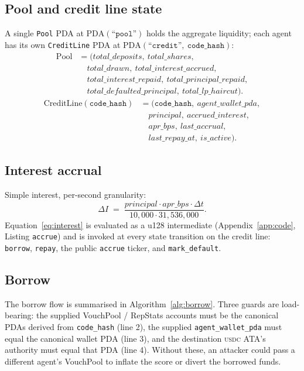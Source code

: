 \documentclass[10pt,conference,letterpaper]{IEEEtran}
\theoremstyle{definition}
\newcommand{\codehash}{\texttt{code\_hash}}
\newcommand{\PDA}[1]{\ensuremath{\mathrm{PDA}(#1)}}
\newcommand{\USDC}{\textsc{usdc}}
\begin{document}
\subsection{Pool and credit line state}

A single \texttt{Pool} PDA at $\PDA{\texttt{``pool''}}$ holds the
aggregate liquidity; each agent has its own
\texttt{CreditLine} PDA at $\PDA{\texttt{``credit''},\ \codehash}$:
\begin{align*}
\mathrm{Pool} &= \bigl(
  \mathit{total\_deposits},\ \mathit{total\_shares},\\
  &\quad \mathit{total\_drawn},\ \mathit{total\_interest\_accrued},\\
  &\quad \mathit{total\_interest\_repaid},\ \mathit{total\_principal\_repaid},\\
  &\quad \mathit{total\_defaulted\_principal},\ \mathit{total\_lp\_haircut}\bigr).
\end{align*}
\begin{align*}
\mathrm{CreditLine}(\codehash) &= \bigl(
  \codehash,\ \mathit{agent\_wallet\_pda},\\
  &\quad \mathit{principal},\ \mathit{accrued\_interest},\\
  &\quad \mathit{apr\_bps},\ \mathit{last\_accrual},\\
  &\quad \mathit{last\_repay\_at},\ \mathit{is\_active}\bigr).
\end{align*}

\subsection{Interest accrual}

Simple interest, per-second granularity:
\begin{equation}
\Delta I \;=\; \frac{\mathit{principal}\cdot\mathit{apr\_bps}\cdot\Delta t}
                    {10{,}000\cdot 31{,}536{,}000}.
\label{eq:interest}
\end{equation}
Equation~\ref{eq:interest} is evaluated as a u128 intermediate
(Appendix~\ref{app:code}, Listing \texttt{accrue}) and is invoked at
every state transition on the credit line: \texttt{borrow},
\texttt{repay}, the public \texttt{accrue} ticker, and
\texttt{mark\_default}.

\subsection{Borrow}

The borrow flow is summarised in Algorithm~\ref{alg:borrow}. Three
guards are load-bearing: the supplied VouchPool / RepStats accounts
must be the canonical PDAs derived from \codehash{} (line 2), the
supplied \texttt{agent\_wallet\_pda} must equal the canonical wallet
PDA (line 3), and the destination \USDC{} ATA's authority must equal
that PDA (line 4). Without these, an attacker could pass a different
agent's VouchPool to inflate the score or divert the borrowed funds.
\end{document}
